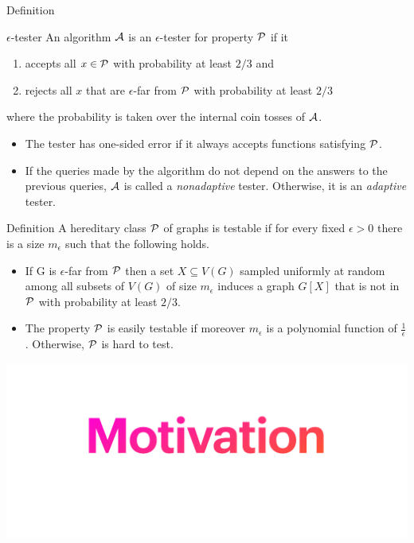 \documentclass{beamer}
\begin{document}
\begin{frame}{Definition}
	\begin{block}{$\epsilon$-tester}
An algorithm ${\cal A}$ is an $\epsilon$-tester for property ${\cal P}$ if it
		\begin{enumerate}
			\item accepts all $x \in {\cal P}$ with probability at least $2/3$	and
			\item  rejects all $x$ that are $\epsilon$-far from ${\cal P}$ with probability at least $2/3$
		\end{enumerate}
		where the probability is taken over the internal coin tosses of ${\cal A}$.
	\end{block}
\pause
\begin{itemize}
	\item The tester has one-sided error if it always accepts functions satisfying ${\cal P}$.
	\pause
	\item  If the queries made by the algorithm do not depend on the answers to the previous queries, ${\cal A}$ is called a {\em nonadaptive} tester.
	Otherwise, it is an {\em adaptive} tester.
\end{itemize}

\end{frame}

\begin{frame}{Definition}
	A hereditary class ${\cal P}$ of graphs is testable if for every fixed $\epsilon > 0$ there is a size $m_{\epsilon}$ such that the following holds. \pause
	\begin{itemize}
		\item If G is $\epsilon$-far from ${\cal P}$ then a set $ X \subseteq V (G)$ sampled
		uniformly at random among all subsets of $V (G)$ of size $m_{\epsilon}$ induces a graph $G[X]$
		that is not in ${\cal P}$ with probability at least $2/3$. \pause
		\item  The property ${\cal P}$ is easily testable if
		moreover $m_{\epsilon}$ is a polynomial function of $\frac{1}{\epsilon}$. Otherwise, ${\cal P}$ is hard to test.
	\end{itemize}

\end{frame}


\begin{frame}
	\begin{center}
		\includegraphics[scale=0.6]{motivation}
	\end{center}
	
\end{frame}
\end{document}
